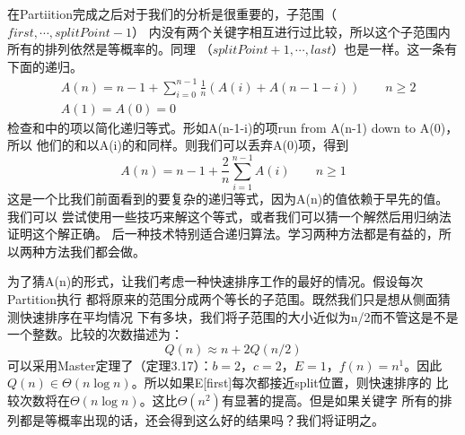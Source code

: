 在Partiition完成之后对于我们的分析是很重要的，子范围（$first, \cdots, splitPoint-1$）
内没有两个关键字相互进行过比较，所以这个子范围内所有的排列依然是等概率的。同理
（$splitPoint+1, \cdots, last$）也是一样。这一条有下面的递归。
\begin{displaymath}
\begin{aligned}
&A(n)=n-1+\sum_{i=0}^{n-1}\frac{1}{n}(A(i)+A(n-1-i)) \qquad  n\geq 2\\
&A(1)=A(0)=0
\end{aligned}
\end{displaymath}
检查和中的项以简化递归等式。形如A(n-1-i)的项run from A(n-1) down to A(0)，所以
他们的和以A(i)的和同样。则我们可以丢弃A(0)项，得到
\begin{equation}\label{Equ:4_1}
A(n)=n-1+\frac{2}{n}\sum_{i=1}^{n-1}A(i)  \qquad  n\geq 1
\end{equation}
这是一个比我们前面看到的要复杂的递归等式，因为A(n)的值依赖于早先的值。我们可以
尝试使用一些技巧来解这个等式，或者我们可以猜一个解然后用归纳法证明这个解正确。
后一种技术特别适合递归算法。学习两种方法都是有益的，所以两种方法我们都会做。

为了猜A(n)的形式，让我们考虑一种快速排序工作的最好的情况。假设每次Partition执行
都将原来的范围分成两个等长的子范围。既然我们只是想从侧面猜测快速排序在平均情况
下有多块，我们将子范围的大小近似为n/2而不管这是不是一个整数。比较的次数描述为：
\begin{displaymath}
Q(n)\approx n+2Q(n/2)
\end{displaymath}
可以采用Master定理了（定理3.17）：$b=2$，$c=2$，$E=1$，$f(n)=n^1$。因此
$Q(n)\in \Theta(n\log n)$。所以如果E[first]每次都接近split位置，则快速排序的
比较次数将在$\Theta(n\log n)$。这比$\Theta(n^2)$有显著的提高。但是如果关键字
所有的排列都是等概率出现的话，还会得到这么好的结果吗？我们将证明之。

